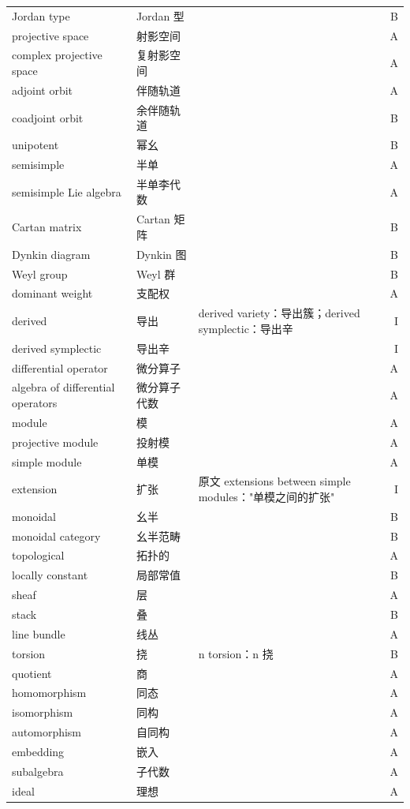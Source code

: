 \begin{longtable}{@{}>{\raggedright\arraybackslash}p{}>{\raggedright\arraybackslash}p{}>{\raggedright\arraybackslash}p{}@{\quad}r@{}}
Jordan type & Jordan 型 &  & B\\
projective space & 射影空间 &  & A\\
complex projective space & 复射影空间 &  & A\\
adjoint orbit & 伴随轨道 &  & A\\
coadjoint orbit & 余伴随轨道 &  & B\\
unipotent & 幂幺 &  & B\\
semisimple & 半单 &  & A\\
semisimple Lie algebra & 半单李代数 &  & A\\
Cartan matrix & Cartan 矩阵 &  & B\\
Dynkin diagram & Dynkin 图 &  & B\\
Weyl group & Weyl 群 &  & B\\
dominant weight & 支配权 &  & A\\
derived & 导出 & derived variety：导出簇；derived symplectic：导出辛 & I\\
derived symplectic & 导出辛 &  & I\\
differential operator & 微分算子 &  & A\\
algebra of differential operators & 微分算子代数 &  & A\\
module & 模 &  & A\\
projective module & 投射模 &  & A\\
simple module & 单模 &  & A\\
extension & 扩张 & 原文 extensions between simple modules："单模之间的扩张" & I\\
monoidal & 幺半 &  & B\\
monoidal category & 幺半范畴 &  & B\\
topological & 拓扑的 &  & A\\
locally constant & 局部常值 &  & B\\
sheaf & 层 &  & A\\
stack & 叠 &  & B\\
line bundle & 线丛 &  & A\\
torsion & 挠 & n torsion：n 挠 & B\\
quotient & 商 &  & A\\
homomorphism & 同态 &  & A\\
isomorphism & 同构 &  & A\\
automorphism & 自同构 &  & A\\
embedding & 嵌入 &  & A\\
subalgebra & 子代数 &  & A\\
ideal & 理想 &  & A\\

\end{longtable}
